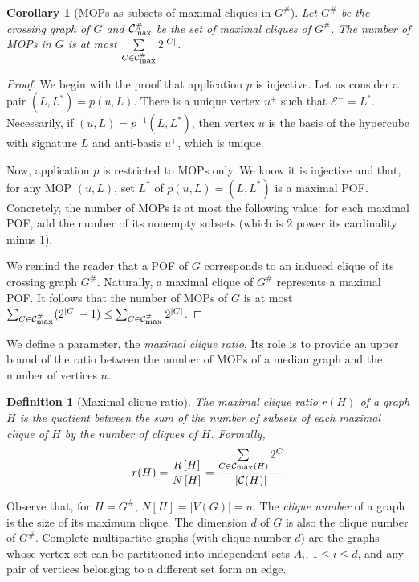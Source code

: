 \documentclass{article}
\newtheorem{definition}{Definition}
\newtheorem{corollary}{Corollary}
\newcommand{\card}[1]{\left| #1 \right|}
\newcommand{\mcalc}{\mathcal{C}}
\newcommand{\mcalcm}{\mathcal{C}_{\mbox{\scriptsize{max}}}}
\begin{document}
\begin{corollary}[MOPs as subsets of maximal cliques in $G^{\#}$]
Let $G^{\#}$ be the crossing graph of $G$ and $\mcalcm^{\#}$ be the set of maximal cliques of $G^{\#}$. The number of MOPs in $G$ is at most $\sum\limits_{C \in \mcalcm^{\#}} 2^{\card{C}}$. 
\label{co:mop_crossing}
\end{corollary}
\begin{proof}
We begin with the proof that application $p$ is injective. Let us consider a pair $(L,L^*) = p(u,L)$. There is a unique vertex $u^+$ such that $\mathcal{E}^- = L^*$. Necessarily, if $(u,L) = p^{-1}(L,L^*)$, then vertex $u$ is the basis of the hypercube with signature $L$ and anti-basis $u^+$, which is unique.

Now, application $p$ is restricted to MOPs only. We know it is injective and that, for any MOP $(u,L)$, set $L^*$ of $p(u,L) = (L,L^*)$ is a maximal POF. Concretely, the number of MOPs is at most the following value: for each maximal POF, add the number of its nonempty subsets (which is $2$ power its cardinality minus 1).

We remind the reader that a POF of $G$ corresponds to an induced clique of its crossing graph $G^{\#}$. Naturally, a maximal clique of $G^{\#}$ represents a maximal POF. It follows that the number of MOPs of $G$ is at most $\sum_{C \in \mcalcm^{\#}} (2^{\card{C}} - 1) \le \sum_{C \in \mcalcm^{\#}} 2^{\card{C}}$.
\end{proof}

We define a parameter, the \textit{maximal clique ratio}. Its role is to provide an upper bound of the ratio between the number of MOPs of a median graph and the number of vertices $n$.

\begin{definition}[Maximal clique ratio]
The maximal clique ratio $r(H)$ of a graph $H$ is the quotient between the sum of the number of subsets of each maximal clique of $H$ by the number of cliques of $H$. Formally,
\[
r(H) = \frac{R\left[ H\right]}{N\left[ H\right]} = \frac{\sum\limits_{C \in \mcalcm(H)} 2^{C}}{\card{\mcalc(H)}}
\]
\end{definition}

Observe that, for $H = G^{\#}$, $N\left[H\right] = \card{V(G)} = n$. The \textit{clique number} of a graph is the size of its maximum clique. The dimension $d$ of $G$ is also the clique number of $G^{\#}$. Complete multipartite graphs (with clique number $d$) are the graphs whose vertex set can be partitioned into independent sets $A_i$, $1\le i\le d$, and any pair of vertices belonging to a different set form an edge.
\end{document}
